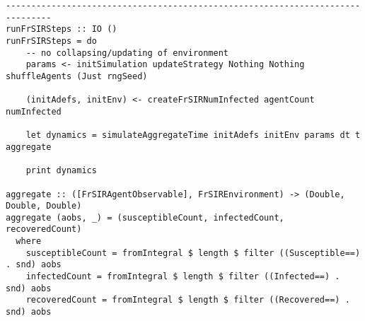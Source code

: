 \begin{verbatim}
-------------------------------------------------------------------------------
runFrSIRSteps :: IO ()
runFrSIRSteps = do
	-- no collapsing/updating of environment
    params <- initSimulation updateStrategy Nothing Nothing shuffleAgents (Just rngSeed)
    
    (initAdefs, initEnv) <- createFrSIRNumInfected agentCount numInfected
    
    let dynamics = simulateAggregateTime initAdefs initEnv params dt t aggregate

	print dynamics
	
aggregate :: ([FrSIRAgentObservable], FrSIREnvironment) -> (Double, Double, Double)
aggregate (aobs, _) = (susceptibleCount, infectedCount, recoveredCount)
  where
    susceptibleCount = fromIntegral $ length $ filter ((Susceptible==) . snd) aobs
    infectedCount = fromIntegral $ length $ filter ((Infected==) . snd) aobs
    recoveredCount = fromIntegral $ length $ filter ((Recovered==) . snd) aobs
\end{verbatim}